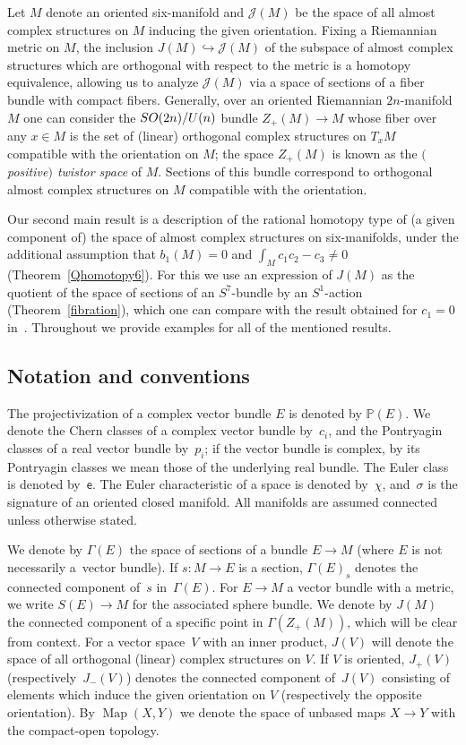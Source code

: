 \documentclass[11pt]{article}
\numberwithin{equation}{section}
\DeclareMathOperator{\Map}{Map}
\numberwithin{equation}{section}
\begin{document}
Let $M$ denote an oriented six-manifold and $\mathcal J(M)$ be the space of
all almost complex structures on $M$ inducing the given orientation.
Fixing a Riemannian metric on $M$, the inclusion $J(M) \hookrightarrow \mathcal J(M)$ of the subspace of almost complex structures which are orthogonal with respect to the metric is a homotopy equivalence, allowing us to analyze $\mathcal J(M)$ via a space of sections of a fiber bundle with compact fibers. Generally, over an oriented Riemannian $2n$-manifold $M$ one can consider the ${\rm SO}(2n)/{\rm U}(n)$ bundle
$Z_+(M) \to M$ whose fiber over any $x \in M$ is the set of (linear) orthogonal complex structures on $T_x M$ compatible with the orientation on $M$; the space $Z_+(M)$ is known as the \emph{$($positive$)$ twistor space} of $M$. Sections of this bundle correspond to orthogonal almost complex structures on $M$ compatible with the orientation.


Our second main result is a description of the rational homotopy type of (a given component of) the space of almost complex structures on six-manifolds, under the additional assumption that $b_1(M) = 0$ and $\int_M c_1c_2 - c_3 \neq 0$ (Theorem~\ref{Qhomotopy6}). For this we use an expression of $J(M)$ as the quotient of the space of sections of an $S^7$-bundle by an $S^1$-action (Theorem~\ref{fibration}), which one can compare with the result obtained for $c_1=0$ in~\cite[Proposition~5.1]{FGM21}.
Throughout we provide examples for all of the mentioned results.

\subsection*{Notation and conventions}

 The projectivization of a complex vector bundle $E$ is denoted by $\mathbb{P}(E)$. We denote the Chern classes of a complex vector bundle by~$c_i$, and the Pontryagin classes of a real vector bundle by~$p_i$; if the vector bundle is complex, by its Pontryagin classes we mean those of the underlying real bundle. The Euler class is denoted by~$\mathsf{e}$. The Euler characteristic of a space is denoted by~$\chi$, and~$\sigma$ is the signature of an oriented closed manifold. All manifolds are assumed connected unless otherwise stated.

We denote by $\Gamma(E)$ the space of sections of a bundle $E \to M$ (where $E$ is not necessarily a~vector bundle). If $s \colon M \to E$ is a section, $\Gamma(E)_s$ denotes the connected component of~$s$ in~$\Gamma(E)$.
For $E \to M$ a vector bundle with a metric, we write $S(E) \to M$ for the associated sphere bundle. We denote by $J(M)$ the connected component of a specific point in $\Gamma(Z_+(M))$, which will be clear from context. For a vector space~$V$ with an inner product, $J(V)$ will denote the space of all orthogonal (linear) complex structures on $V$. If $V$ is oriented, $J_+(V)$ (respectively~$J_-(V)$) denotes the connected component of~$J(V)$ consisting of elements which induce the given orientation on $V$ (respectively the opposite orientation). By $\Map(X,Y)$ we denote the space of unbased maps $X \to Y$ with the compact-open topology.
\end{document}

